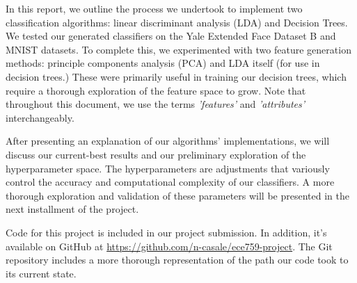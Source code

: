 In this report, we outline the process we undertook to implement two classification algorithms: linear discriminant analysis (LDA) and Decision Trees. We tested our generated classifiers on the Yale Extended Face Dataset B  and MNIST \cite{lecun-mnisthandwrittendigit-2010} datasets. To complete this, we experimented with two feature generation methods: principle components analysis (PCA) and LDA itself (for use in decision trees.) These were primarily useful in training our decision trees, which require a thorough exploration of the feature space to grow. Note that throughout this document, we use the terms \emph{'features'} and \emph{'attributes'} interchangeably.

After presenting an explanation of our algorithms' implementations, we will discuss our current-best results and our preliminary exploration of the hyperparameter space. The hyperparameters are adjustments that variously control the accuracy and computational complexity of our classifiers. A more thorough exploration and validation of these parameters will be presented in the next installment of the project.

Code for this project is included in our project submission. In addition, it's available on GitHub at \href{https://github.com/n-casale/ece759-project}{https://github.com/n-casale/ece759-project}. The Git repository includes a more thorough representation of the path our code took to its current state. 